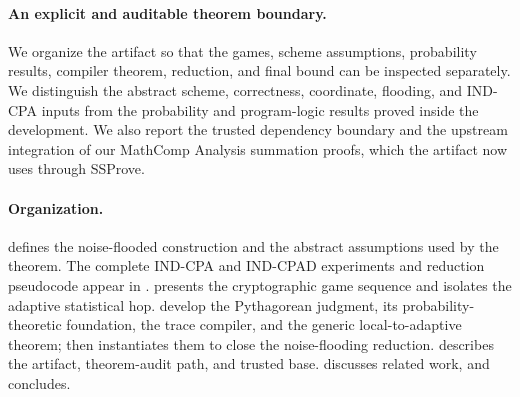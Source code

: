 \paragraph{An explicit and auditable theorem boundary.}
We organize the artifact so that the games, scheme assumptions, probability results, compiler theorem, reduction, and final bound can be inspected separately. We distinguish the abstract scheme, correctness, coordinate, flooding, and IND-CPA inputs from the probability and program-logic results proved inside the development. We also report the trusted dependency boundary and the upstream integration of our MathComp Analysis summation proofs, which the artifact now uses through SSProve.

\paragraph{Organization.}
 defines the noise-flooded construction and the abstract assumptions used by the theorem. The complete IND-CPA and IND-CPAD experiments and reduction pseudocode appear in .  presents the cryptographic game sequence and isolates the adaptive statistical hop.  develop the Pythagorean judgment, its probability-theoretic foundation, the trace compiler, and the generic local-to-adaptive theorem;  then instantiates them to close the noise-flooding reduction.  describes the artifact, theorem-audit path, and trusted base.  discusses related work, and  concludes.
